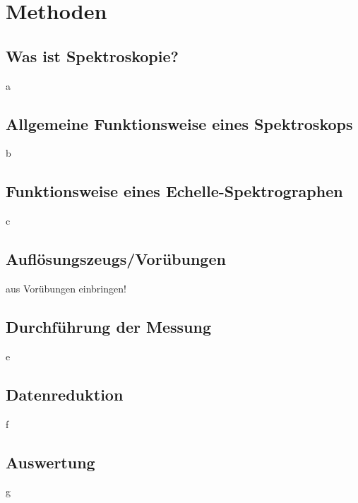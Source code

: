 \section{Methoden}
\subsection{Was ist Spektroskopie?}
a

\subsection{Allgemeine Funktionsweise eines Spektroskops}
b

\subsection{Funktionsweise eines Echelle-Spektrographen}
c

\subsection{Auflösungszeugs/Vorübungen}
aus Vorübungen einbringen!

\subsection{Durchführung der Messung}
e

\subsection{Datenreduktion}
f

\subsection{Auswertung}
g

